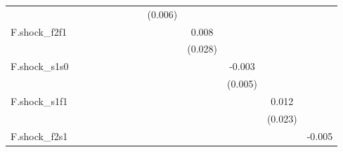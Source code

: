 {\begin{tabular}{l*{12}{c}}
            &                     &                     &                     &                     &                     &                     &                     &     (0.006)         &                     &                     &                     &                     \\
\addlinespace
F.shock\_f2f1&                     &                     &                     &                     &                     &                     &                     &                     &       0.008         &                     &                     &                     \\
            &                     &                     &                     &                     &                     &                     &                     &                     &     (0.028)         &                     &                     &                     \\
\addlinespace
F.shock\_s1s0&                     &                     &                     &                     &                     &                     &                     &                     &                     &      -0.003         &                     &                     \\
            &                     &                     &                     &                     &                     &                     &                     &                     &                     &     (0.005)         &                     &                     \\
\addlinespace
F.shock\_s1f1&                     &                     &                     &                     &                     &                     &                     &                     &                     &                     &       0.012         &                     \\
            &                     &                     &                     &                     &                     &                     &                     &                     &                     &                     &     (0.023)         &                     \\
\addlinespace
F.shock\_f2s1&                     &                     &                     &                     &                     &                     &                     &                     &                     &                     &                     &      -0.005         \\

\end{tabular}}
